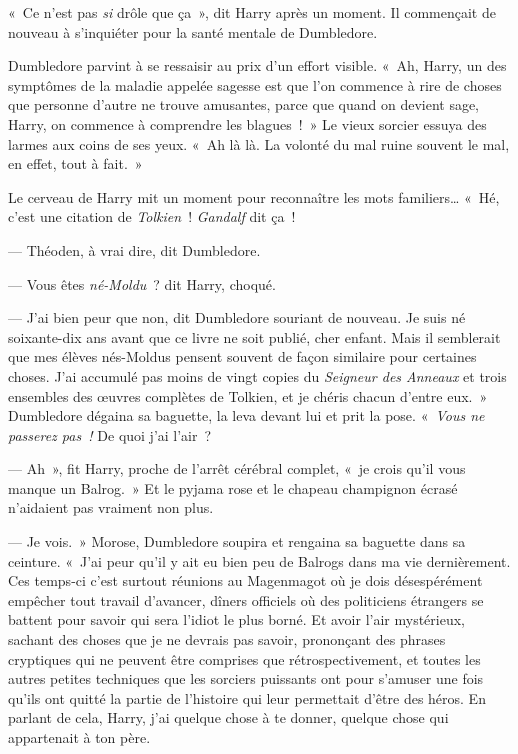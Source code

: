 «~Ce n'est pas \emph{si} drôle que ça~», dit Harry après un moment.
Il commençait de nouveau à s'inquiéter pour la santé mentale de Dumbledore.

Dumbledore parvint à se ressaisir au prix d'un effort visible.
«~Ah, Harry, un des symptômes de la maladie appelée sagesse est que l'on commence à rire de choses que personne d'autre ne trouve amusantes, parce que quand on devient sage, Harry, on commence à comprendre les blagues~!~»
Le vieux sorcier essuya des larmes aux coins de ses yeux.
«~Ah là là.
La volonté du mal ruine souvent le mal, en effet, tout à fait.~»

Le cerveau de Harry mit un moment pour reconnaître les mots familiers…
«~Hé, c'est une citation de \emph{Tolkien}~!
\emph{Gandalf} dit ça~!

--- Théoden, à vrai dire, dit Dumbledore.

--- Vous êtes \emph{né-Moldu}~? dit Harry, choqué.

--- J'ai bien peur que non, dit Dumbledore souriant de nouveau.
Je suis né soixante-dix ans avant que ce livre ne soit publié, cher enfant.
Mais il semblerait que mes élèves nés-Moldus pensent souvent de façon similaire pour certaines choses.
J'ai accumulé pas moins de vingt copies du \emph{Seigneur des Anneaux} et trois ensembles des œuvres complètes de Tolkien, et je chéris chacun d'entre eux.~»
Dumbledore dégaina sa baguette, la leva devant lui et prit la pose.
«~\emph{Vous ne passerez pas~!}
De quoi j'ai l'air~?

--- Ah~», fit Harry, proche de l'arrêt cérébral complet, «~je crois qu'il vous manque un Balrog.~»
Et le pyjama rose et le chapeau champignon écrasé n'aidaient pas vraiment non plus.

--- Je vois.~»
Morose, Dumbledore soupira et rengaina sa baguette dans sa ceinture.
«~J'ai peur qu'il y ait eu bien peu de Balrogs dans ma vie dernièrement.
Ces temps-ci c'est surtout réunions au Magenmagot où je dois désespérément empêcher tout travail d'avancer, dîners officiels où des politiciens étrangers se battent pour savoir qui sera l'idiot le plus borné.
Et avoir l'air mystérieux, sachant des choses que je ne devrais pas savoir, prononçant des phrases cryptiques qui ne peuvent être comprises que rétrospectivement, et toutes les autres petites techniques que les sorciers puissants ont pour s'amuser une fois qu'ils ont quitté la partie de l'histoire qui leur permettait d'être des héros.
En parlant de cela, Harry, j'ai quelque chose à te donner, quelque chose qui appartenait à ton père.

